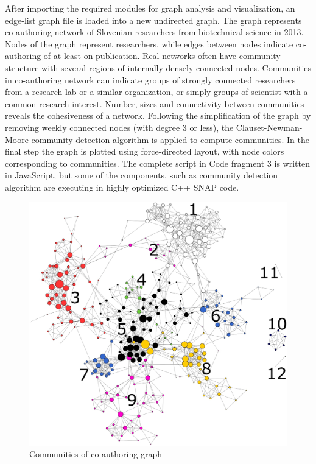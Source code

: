 \documentclass{article} %
\begin{document}
After importing the required modules for graph analysis and visualization, an edge-list graph file is loaded into a new undirected graph. The graph represents co-authoring network of Slovenian researchers from biotechnical science in 2013. Nodes of the graph represent researchers, while edges between nodes indicate co-authoring of at least on publication. Real networks often have community structure with several regions of internally densely connected nodes. Communities in co-authoring network can indicate groups of strongly connected researchers from a research lab or a similar organization, or simply groups of scientist with a common research interest. Number, sizes and connectivity between communities reveals the cohesiveness of a network. Following the simplification of the graph by removing weekly connected nodes (with degree 3 or less), the Clauset-Newman-Moore \cite{clauset-newman-moore} community detection algorithm is applied to compute communities. In the final step the graph is plotted using force-directed layout, with node colors corresponding to communities. The complete script in Code fragment 3 is written in JavaScript, but some of the components, such as community detection algorithm are executing in highly optimized C++ SNAP code.
\begin{figure}[h]
\begin{center}
\includegraphics[scale=0.25]{communities_labeled.jpg} 
\caption{Communities of co-authoring graph}
\end{center}
\end{figure}
\end{document}
